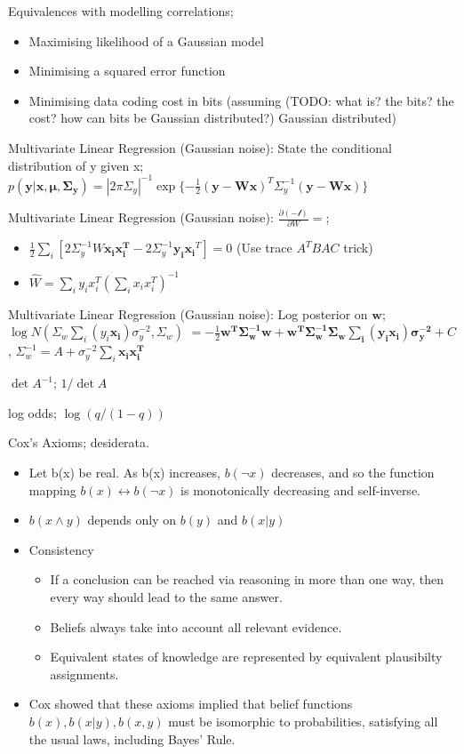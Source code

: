 \documentclass{article}
\begin{document}
Equivalences with modelling correlations; \begin{itemize} \item Maximising likelihood of a Gaussian model \item Minimising a squared error function \item Minimising data coding cost in bits (assuming (TODO: what is? the bits? the cost? how can bits be Gaussian distributed?) Gaussian distributed) \end{itemize}

Multivariate Linear Regression (Gaussian noise): State the conditional distribution of y given x; $p(\mathbf{y|x, \mu, \Sigma_y}) = |2\pi\Sigma_y|^{-1}\exp\{-\frac{1}{2}(\mathbf{y-Wx})^T\Sigma_y^{-1}(\mathbf{y-Wx})\}$

Multivariate Linear Regression (Gaussian noise): $\frac{\partial(-\mathcal{l})}{\partial W} = $; \begin{itemize} \item $\frac{1}{2}\sum_i [2\Sigma^{-1}_yW\mathbf{x_ix_i^T}-2\Sigma_y^{-1}\mathbf{y_ix_i}^T]=0$ (Use trace $A^TBAC$ trick) \item $\hat{W} = \sum_i y_ix_i^T(\sum_i x_i x_i^T)^{-1}$ \end{itemize}


Multivariate Linear Regression (Gaussian noise): Log posterior on $\mathbf{w}$; $\log N(\Sigma_w\sum_i(y_i\mathbf{x_i})\sigma^{-2}_y,\Sigma_w)$ $ = -\frac{1}{2}\mathbf{w^T\Sigma_w^{-1}w+w^T\Sigma^{-1}_w\Sigma_w\sum_i(y_i\mathbf{x_i})\sigma_y^{-2}}+C$, $\Sigma_w^{-1} = A+\sigma_y^{-2}\sum_i \mathbf{x_ix_i^T}$

$\det A^{-1}$; $1/\det A$

log odds; $\log(q/(1-q))$

Cox's Axioms; desiderata. \begin{itemize} \item Let b(x) be real. As b(x) increases, $b(\neg x)$ decreases, and so the function mapping $b(x) \leftrightarrow b(\neg x)$ is monotonically decreasing and self-inverse.  \item $b(x \wedge y)$ depends only on $b(y)$ and $b(x|y)$ \item Consistency \begin{itemize} \item If a conclusion can be reached via reasoning in more than one way, then every way should lead to the same answer.  \item Beliefs always take into account all relevant evidence.  \item Equivalent states of knowledge are represented by equivalent plausibilty assignments.  \end{itemize} \item Cox showed that these axioms implied that belief functions $b(x), b(x|y), b(x,y)$ must be isomorphic to probabilities, satisfying all the usual laws, including Bayes' Rule.  \end{itemize} 
            
\end{document}
